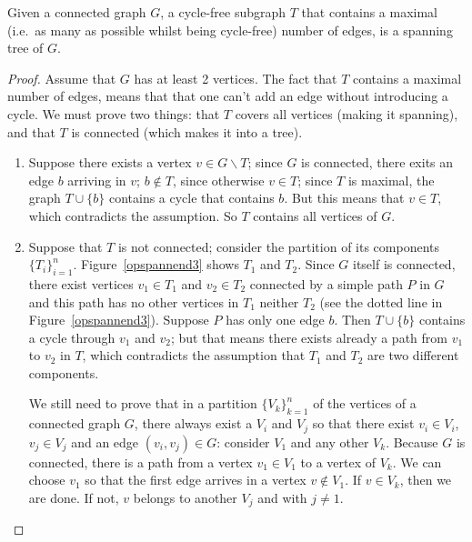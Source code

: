 \begin{theorem}\label{opspannend4}
Given a connected graph $G$, a cycle-free subgraph $T$ that contains a
maximal (i.e.\ as many as possible whilst being cycle-free) number of edges, is a spanning tree of $G$.
\end{theorem}
\begin{proof}

Assume that $G$ has at least 2 vertices. The fact that $T$ contains a maximal number of edges, means that that one can't add an edge without introducing a cycle. We must prove two things: that $T$ covers all vertices (making it spanning), and that $T$ is connected (which makes it into a tree).

\begin{enumerate}
\item Suppose there exists a vertex $v \in G \backslash T$; since $G$ is
connected, there exits an edge $b$ arriving in $v$; $b \notin T$,
since otherwise $v \in T$; since $T$ is maximal, the graph $T \cup
\{b\}$ contains a cycle that contains $b$. But this means that $v \in
T$, which contradicts the assumption. So $T$ contains all vertices of
$G$.

\item Suppose that $T$ is not connected; consider the partition of its
components $\{T_{i}\}_{i=1}^{n}$. Figure~\ref{opspannend3} shows
$T_{1}$ and $T_{2}$. Since $G$ itself is connected, there exist
vertices $v_{1} \in T_{1}$ and $v_{2} \in T_{2}$ connected by a simple
path $P$ in $G$ and this path has no other vertices in $T_{1}$ neither
$T_{2}$ (see the dotted line in Figure~\ref{opspannend3}). Suppose $P$
has only one edge $b$. Then $T \cup \{b\}$ contains a cycle through
$v_{1}$ and $v_{2}$; but that means there exists already a path from
$v_{1}$ to $v_{2}$ in $T$, which contradicts the assumption that
$T_{1}$ and $T_{2}$ are two different components.

We still need to prove that in a partition $\{V_{k}\}_{k=1}^{n}$ of the
vertices of a connected graph $G$, there always exist a $V_{i}$ and
$V_{j}$ so that there exist $v_{i} \in V_{i}$, $v_{j} \in V_{j}$ and
an edge $(v_{i},v_{j}) \in G$: consider $V_{1}$ and any other $V_{k}$.
Because $G$ is connected, there is a path from a vertex $v_{1} \in
V_{1}$ to a vertex of $V_{k}$. We can choose $v_{1}$ so that the first
edge arrives in a vertex $v \notin V_{1}$. If $v \in V_{k}$, then we
are done. If not, $v$ belongs to another $V_{j}$ and with $j \neq 1$.\vspace{-2em}
\end{enumerate}
\end{proof}


